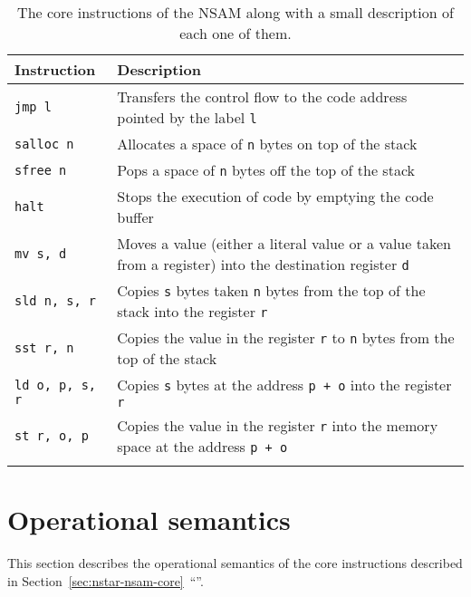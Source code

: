 \begin{longtable}[H]{p{}p{}}
  \toprule
  Instruction & Description \\
  \midrule \endhead
  \texttt{jmp l} & Transfers the control flow to the code address pointed by the label \texttt{l} \\
  \texttt{salloc n} & Allocates a space of \texttt{n} bytes on top of the stack \\
  \texttt{sfree n} & Pops a space of \texttt{n} bytes off the top of the stack \\
  \texttt{halt} & Stops the execution of code by emptying the code buffer \\
  \texttt{mv s, d} & Moves a value (either a literal value or a value taken from a register) into the destination register \texttt{d} \\
  \texttt{sld n, s, r} & Copies \texttt{s} bytes taken \texttt{n} bytes from the top of the stack into the register \texttt{r} \\
  \texttt{sst r, n} & Copies the value in the register \texttt{r} to \texttt{n} bytes from the top of the stack \\
  \texttt{ld o, p, s, r} & Copies \texttt{s} bytes at the address \texttt{p + o} into the register \texttt{r} \\
  \texttt{st r, o, p} & Copies the value in the register \texttt{r} into the memory space at the address \texttt{p + o} \\
  \bottomrule

  \caption{The core instructions of the NSAM along with a small description of each one of them.}
  \label{fig:nstar-nsam-core-instructions}
\end{longtable}

\section{Operational semantics}\label{sec:nstar-nsam-opsem}

This section describes the operational semantics of the core instructions described in Section~\ref{sec:nstar-nsam-core}~``''.

